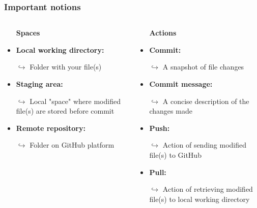 \documentclass[xcolor=x11names,compress]{beamer}
\renewcommand{\(}{\begin{columns}}
\renewcommand{\)}{\end{columns}}
\newcommand{\<}[1]{\begin{column}{#1}}
\renewcommand{\>}{\end{column}}
\begin{document}
\begin{frame}
\frametitle{Important notions}
\begin{columns}[t]
 \begin{column}{0.5\textwidth}
    \begin{itemize}[<+->]
     \item[]
   \begin{center}
    \textcolor{brique}{\textbf{Spaces}}
   \end{center}
    \item  \textcolor{siap}{\textbf{Local working directory:}}
    \item[$\hookrightarrow$] Folder with your file(s)
    \item  \textcolor{siap}{\textbf{Staging area:}}
    \item[$\hookrightarrow$] Local "space" where modified file(s) are stored before commit
    \item \textcolor{siap}{\textbf{Remote repository:}}
    \item[$\hookrightarrow$] Folder  on GitHub platform
    \end{itemize}
 \end{column}
 \begin{column}{0.5\textwidth}
    \begin{itemize}[<+->]
        \item[]
        \begin{center}
        \textcolor{brique}{\textbf{Actions}}
        \end{center}
        \item \textcolor{siap}{\textbf{Commit:}}
        \item[$\hookrightarrow$] A snapshot of file changes
        \item \textcolor{siap}{\textbf{Commit message:}}
        \item[$\hookrightarrow$] A concise description of the changes made
        \item \textcolor{siap}{\textbf{Push:}}
        \item[$\hookrightarrow$] Action of sending modified file(s) to GitHub
        \item \textcolor{siap}{\textbf{Pull:}}
        \item[$\hookrightarrow$] Action of retrieving modified file(s) to local working directory


    \end{itemize}
 \end{column}
\end{columns}
\end{frame}
\end{document}
